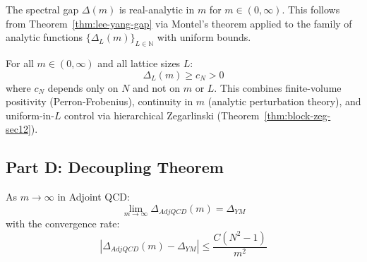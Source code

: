 \begin{corollary}
\label{cor:analyticity-adjoint}
The spectral gap $\Delta(m)$ is real-analytic in $m$ for $m \in (0, \infty)$. This follows from Theorem~\ref{thm:lee-yang-gap} via Montel's theorem applied to the family of analytic functions $\{\Delta_L(m)\}_{L \in \mathbb{N}}$ with uniform bounds.
\end{corollary}

\begin{theorem}
\label{thm:uniform-bound-adjoint}
For all $m \in (0, \infty)$ and all lattice sizes $L$:
\[
\Delta_L(m) \geq c_N > 0
\]
where $c_N$ depends only on $N$ and not on $m$ or $L$. This combines finite-volume positivity (Perron-Frobenius), continuity in $m$ (analytic perturbation theory), and uniform-in-$L$ control via hierarchical Zegarlinski (Theorem~\ref{thm:block-zeg-sec12}).
\end{theorem}

\subsection{Part D: Decoupling Theorem}

\begin{theorem}
\label{thm:decoupling-rigorous}
\label{thm:decoupling-formula}%
As $m \to \infty$ in Adjoint QCD:
\begin{equation}
\lim_{m \to \infty} \Delta_{AdjQCD}(m) = \Delta_{YM}
\end{equation}
with the convergence rate:
\begin{equation}
|\Delta_{AdjQCD}(m) - \Delta_{YM}| \leq \frac{C(N^2-1)}{m^2}
\end{equation}
\end{theorem}

